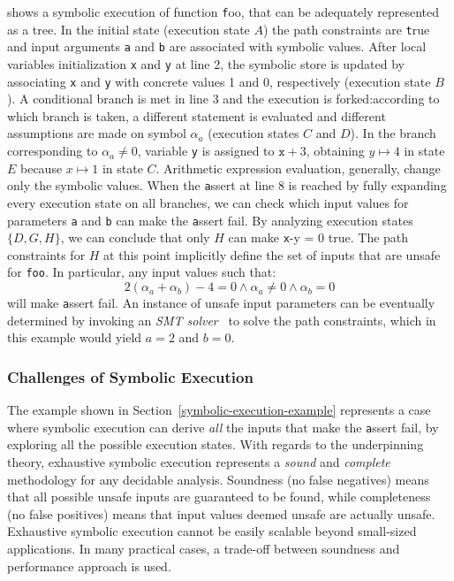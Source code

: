 \noindent {} shows a symbolic execution of function {\texttt foo}, that can be adequately represented as a tree. In the initial state (execution state $A$) the path constraints are {\texttt true} and input arguments {\texttt a} and {\texttt b} are associated with symbolic values. 
After local variables initialization {\texttt x} and {\texttt y} at line 2, the symbolic store is updated by associating {\texttt x} and {\texttt y} with concrete values 1 and 0, respectively (execution state $B$). A conditional branch is met in line 3 and the execution is forked:according to which branch is taken, a different statement is evaluated and different assumptions are made on symbol $\alpha_a$ (execution states $C$ and $D$). In the branch corresponding to $\alpha_a\neq 0$, variable {\texttt y} is assigned to  ${\texttt x}+3$, obtaining $y\mapsto 4$ in state $E$ because $x\mapsto 1$ in state $C$. Arithmetic expression evaluation, generally, change only the symbolic values.
When the {\texttt assert} at line 8 is reached by fully expanding every execution state  on all branches, we can check which input values for parameters {\texttt a} and {\texttt b} can make the {\texttt assert} fail. By analyzing execution states $\{D,G,H\}$, we can conclude that only $H$ can make {\texttt x-y = 0} true. The path constraints for $H$ at this point implicitly define the set of inputs that are unsafe for \texttt{foo}. 
In particular, any input values such that:
\[ 2(\alpha_a+\alpha_b)-4 = 0 \wedge \alpha_a \neq 0 \wedge \alpha_b = 0 \]
will make {\texttt assert} fail. An instance of unsafe input parameters can be eventually determined by invoking an {\em SMT solver}~\cite{BKM14} to solve the path constraints, which in this example would yield $a = 2$ and $b = 0$.

\subsubsection{Challenges of Symbolic Execution}
\label{example-discussion}

The example shown in Section~\ref{symbolic-execution-example} represents a case where symbolic execution can derive {\em all} the inputs that make the {\texttt assert} fail, by exploring all the possible execution states. With regards to the underpinning theory, exhaustive symbolic execution represents a {\em sound} and {\em complete} methodology for any decidable analysis. Soundness (no false negatives) means that all possible unsafe inputs are guaranteed to be found, while completeness (no false positives) means that  input values deemed unsafe are actually unsafe. Exhaustive symbolic execution cannot be easily scalable beyond small-sized applications. In many practical cases, a trade-off between soundness and performance approach is used.

